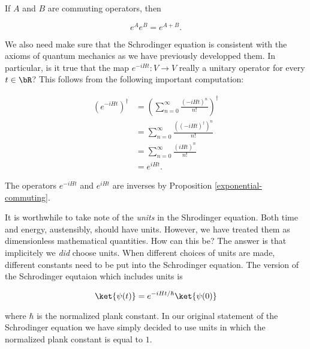 \begin{prop}\label{exponential-commuting} If $A$ and $B$ are commuting operators, then

$$e^{A}e^{B}=e^{A+B}.$$
\end{prop}

\begin{rem}
We also need make sure that the Schrodinger equation is consistent with the axioms of quantum mechanics as we have previously developped them. In particular, is it true that the map $e^{-iHt}: V\to V$ really a unitary operator for every $t\in \bR$? This follows from the following important computation:

\begin{align*}
\left(e^{-iHt}\right)^\dagger &= \left(\sum_{n=0}^{\infty}\frac{(-i H t)^n}{n!}\right)^{\dagger}\\
&= \sum_{n=0}^{\infty}\frac{\left((-i H t)^\dagger\right)^n}{n!}\\
&= \sum_{n=0}^{\infty}\frac{\left(i H t\right)^n}{n!}\\
&=e^{i H t}.
\end{align*}

The operators $e^{- i H t}$ and $e^{i H t}$ are inverses by Proposition \ref{exponential-commuting}.
\end{rem}

\begin{rem}
It is worthwhile to take note of the {\em units} in the Shrodinger equation. Both time and energy, austensibly, should have units. However, we have treated them as dimensionless mathematical quantities. How can this be? The answer is that implicitely we {\em did} choose units. When different choices of units are made, different constants need to be put into the Schrodinger equation. The version of the Schrodinger equtaion which includes units is

$$\ket{\psi(t)}=e^{-i H t/\hbar}\ket{\psi(0)}$$

where $\hbar$ is the normalized plank constant. In our original statement of the Schrodinger equation we have simply decided to use units in which the normalized plank constant is equal to $1$.
\end{rem}

